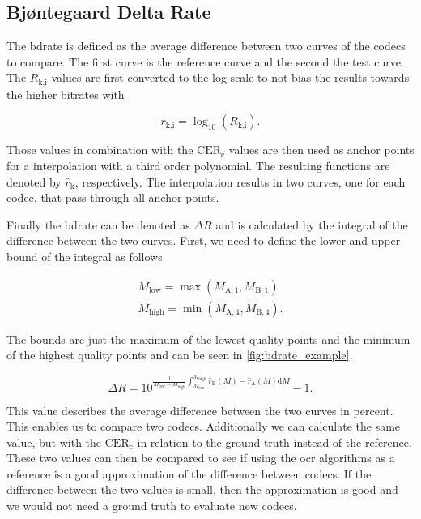 \subsection{Bjøntegaard Delta Rate}
\label{subsec:bdrate}

The \gls{bdrate} \cite{bdrate_original_2001}\cite{bdrate_beyond_2022} is defined as the average difference between two curves of the codecs to compare.
The first curve is the reference curve and the second the test curve.
The $R_{\text{k,i}}$ values are first converted to the log scale to not bias the results towards the higher bitrates with

\begin{equation}
    r_{\text{k,i}} = \log_{10}\left(R_{\text{k,i}}\right).
    \label{eq:log_scale}
\end{equation}

Those values in combination with the $\text{CER}_{\text{c}}$ values are then used as anchor points for a interpolation with a third order polynomial.
The resulting functions are denoted by $\hat{r}_{\text{k}}$, respectively.
The interpolation results in two curves, one for each codec, that pass through all anchor points.

Finally the \gls{bdrate} can be denoted as $\Delta R$ and is calculated by the integral of the difference between the two curves.
First, we need to define the lower and upper bound of the integral as follows

\begin{equation}
    \begin{aligned}
        M_{\text{low}} = \max\left(M_{\text{A},1}, M_{\text{B},1}\right) \\
        M_{\text{high}} = \min\left(M_{\text{A},4}, M_{\text{B},4}\right).
    \end{aligned}
    \label{eq:bounds}
\end{equation}

The bounds are just the maximum of the lowest quality points and the minimum of the highest quality points and can be seen in \autoref{fig:bdrate_example}.

\begin{equation}
    \Delta R = 10^{\frac{1}{M_{\text{low}}-M_{\text{high}}} \int_{M_{\text{low}}}^{M_{\text{high}}} \hat{r}_{\text{B}}(M) - \hat{r}_{\text{A}}(M) \text{d}M} - 1.
    \label{eq:bdrate}
\end{equation}

This value describes the average difference between the two curves in percent.
This enables us to compare two codecs.
Additionally we can calculate the same value, but with the $\text{CER}_{\text{c}}$ in relation to the ground truth instead of the reference.
These two values can then be compared to see if using the \gls{ocr} algorithms as a reference is a good approximation of the difference between codecs.
If the difference between the two values is small, then the approximation is good and we would not need a ground truth to evaluate new codecs.

